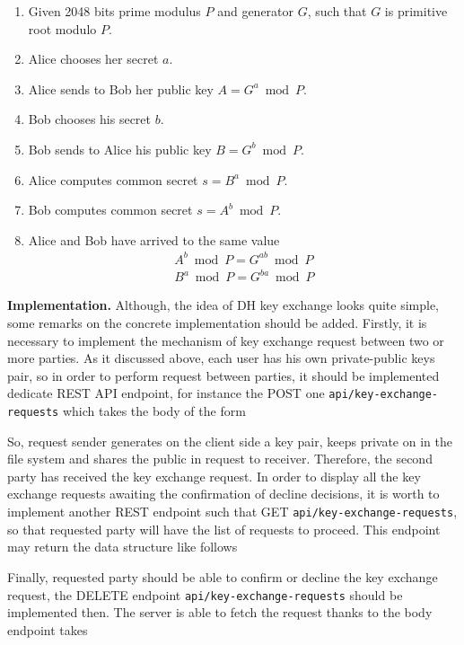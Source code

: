 \begin{enumerate}
    \item Given 2048 bits prime modulus $P$ and generator $G$, such that $G$ is primitive root modulo $P$.
    \item Alice chooses her secret $a$.
    \item Alice sends to Bob her public key $A = G^a \bmod P$.
    \item Bob chooses his secret $b$.
    \item Bob sends to Alice his public key $B = G^b \bmod P$.
    \item Alice computes common secret $s = B^a \bmod P$.
    \item Bob computes common secret $s = A^b \bmod P$.
    \item Alice and Bob have arrived to the same value
    \begin{eqnarray*}
        A^b \bmod P = G^{ab} \bmod P \\
        B^a \bmod P = G^{ba} \bmod P
    \end{eqnarray*}
\end{enumerate}

\textbf{Implementation.} Although, the idea of DH key exchange looks quite simple, some remarks on the concrete
implementation should be added.
Firstly, it is necessary to implement the mechanism of key exchange request between two or more parties.
As it discussed above, each user has his own private-public keys pair, so in order to perform request between parties,
it should be implemented dedicate REST API endpoint, for instance the POST one \texttt{api/key-exchange-requests} which
takes the body of the form



So, request sender generates on the client side a key pair, keeps private on in the file system and shares the public
in request to receiver.
Therefore, the second party has received the key exchange request.
In order to display all the key exchange requests awaiting the confirmation of decline decisions, it is worth to implement
another REST endpoint such that GET \texttt{api/key-exchange-requests}, so that requested party will have the list of
requests to proceed.
This endpoint may return the data structure like follows



Finally, requested party should be able to confirm or decline the key exchange request, the DELETE endpoint
\texttt{api/key-exchange-requests} should be implemented then.
The server is able to fetch the request thanks to the body endpoint takes

